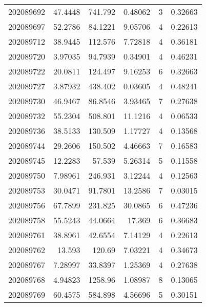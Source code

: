 \begin{tabular}{rrrrrr}
 202089692 &         47.4448  &      741.792  &            0.48062 &           3 & 0.32663 \\
 202089697 &         52.2786  &       84.1221 &            9.05706 &           4 & 0.22613 \\
 202089712 &         38.9445  &      112.576  &            7.72818 &           4 & 0.36181 \\
 202089720 &          3.97035 &       94.7939 &            0.34901 &           4 & 0.46231 \\
 202089722 &         20.0811  &      124.497  &            9.16253 &           6 & 0.32663 \\
 202089727 &          3.87932 &      438.402  &            0.03605 &           4 & 0.48241 \\
 202089730 &         46.9467  &       86.8546 &            3.93465 &           7 & 0.27638 \\
 202089732 &         55.2304  &      508.801  &           11.1216  &           4 & 0.06533 \\
 202089736 &         38.5133  &      130.509  &            1.17727 &           4 & 0.13568 \\
 202089744 &         29.2606  &      150.502  &            4.46663 &           7 & 0.16583 \\
 202089745 &         12.2283  &       57.539  &            5.26314 &           5 & 0.11558 \\
 202089750 &          7.98961 &      246.931  &            3.12244 &           4 & 0.12563 \\
 202089753 &         30.0471  &       91.7801 &           13.2586  &           7 & 0.03015 \\
 202089756 &         67.7899  &      231.825  &           30.0865  &           6 & 0.47236 \\
 202089758 &         55.5243  &       44.0664 &           17.369   &           6 & 0.36683 \\
 202089761 &         38.8961  &       42.6554 &            7.14129 &           4 & 0.22613 \\
 202089762 &         13.593   &      120.69   &            7.03221 &           4 & 0.34673 \\
 202089767 &          7.28997 &       33.8397 &            1.25369 &           4 & 0.27638 \\
 202089768 &          4.94823 &     1258.96   &            1.08987 &           8 & 0.13065 \\
 202089769 &         60.4575  &      584.898  &            4.56696 &           5 & 0.30151 \\

\end{tabular}
